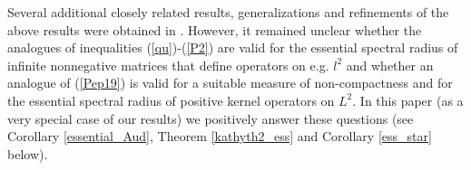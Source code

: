 \documentclass[12pt, reqno]{amsart}
\theoremstyle{definition}
\theoremstyle{remark}
\numberwithin{equation}{section}
\newcommand{\be}{\begin{equation}}
\newcommand{\ee}{\end{equation}}
\begin{document}
Several additional closely related results, generalizations and refinements of the above results were obtained in \cite{P19, Zh18, P21, BP21, BP22b, B23+}. However, it remained unclear whether the analogues of inequalities
(\ref{qu})-(\ref{P2}) are valid for the essential spectral radius of infinite nonnegative matrices that define operators on e.g. $l^2$ and whether an analogue of (\ref{Pep19}) is valid for a suitable measure of non-compactness and for the essential spectral radius of positive kernel operators on $L^2$.  In this paper (as a very special case of our results) we positively answer these questions (see Corollary \ref{essential_Aud}, Theorem \ref{kathyth2_ess} and Corollary \ref{ess_star} below).
\end{document}
